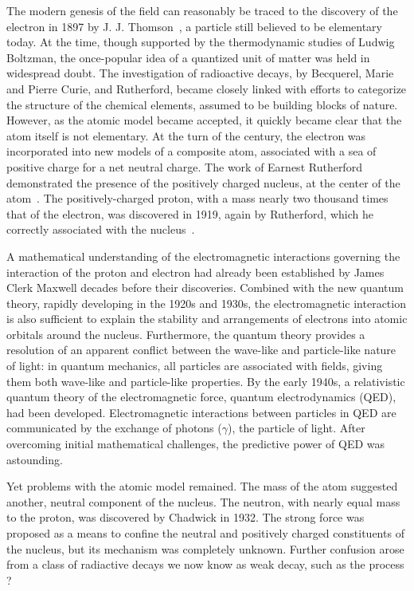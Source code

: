 The modern genesis of the field can reasonably be traced to 
the discovery of the electron in 1897 by J. J. Thomson~\cite{doi:10.1080/14786449708621070}, a particle still
believed to be elementary today.
At the time, though supported by the thermodynamic studies of Ludwig Boltzman,
the once-popular idea of a quantized unit of matter was
held in widespread doubt. 
The investigation of radioactive decays, by Becquerel,
Marie and Pierre Curie, and Rutherford, 
became closely linked with efforts to categorize
the structure of the chemical elements, assumed to be
building blocks of nature. 
However, as the atomic model became accepted, 
it quickly became clear that the atom itself is not elementary.
At the turn of the century, the electron was incorporated into 
new models of a composite atom,
associated with a sea of positive charge for a net neutral charge.
The work of Earnest Rutherford demonstrated the presence of the
positively charged nucleus, at the center of the atom~\cite{Rutherford:1911zz}.
The positively-charged proton, with a mass nearly two thousand times
that of the electron, was discovered in 1919, again by Rutherford,
which he correctly associated with the 
nucleus~\cite{doi:10.1080/14786440608635919}.

A mathematical understanding of the electromagnetic interactions 
governing the interaction of the proton and electron had
already been established by James Clerk Maxwell decades before their discoveries.
Combined with the new quantum theory, rapidly developing in the 1920s and 1930s, the electromagnetic
interaction is also sufficient to explain the stability and arrangements of
electrons into atomic orbitals around the nucleus. 
Furthermore, the quantum theory provides a resolution of an apparent
conflict between the wave-like and particle-like nature of light:
in quantum mechanics, all particles are associated with fields, giving
them both wave-like and particle-like properties. 
By the early 1940s, a relativistic quantum theory of the electromagnetic force,
quantum electrodynamics (QED), had
been developed. Electromagnetic interactions 
between particles in QED are communicated by the exchange of photons ($\gamma$),
the particle of light. After overcoming initial mathematical challenges, 
the predictive power of QED was astounding.

Yet problems with the atomic model remained. The mass of the atom
suggested another, neutral component of the nucleus. 
The neutron, with nearly equal mass to the proton, was
discovered by Chadwick in 1932. The strong force was proposed as
a means to 
confine the neutral and positively charged constituents of the nucleus,
but its mechanism was completely unknown.
Further confusion arose from a class of radiactive decays we now
know as weak decay, such as the process ?

